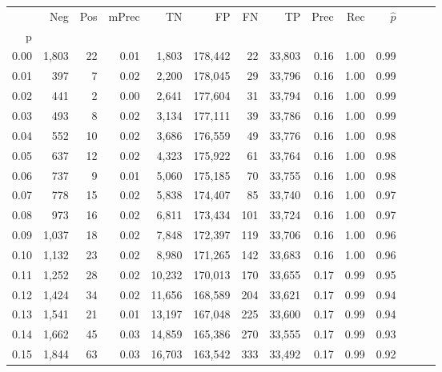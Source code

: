 \begin{tabular}{rrrrrrrrrrrrrr}
\toprule
{} &    Neg &  Pos & mPrec &       TN &       FP &      FN &      TP &  Prec &   Rec & $\hat{p}$ \\
p    &        &      &       &          &          &         &         &       &       &           \\
\midrule
0.00 &  1,803 &   22 &  0.01 &    1,803 &  178,442 &      22 &  33,803 &  0.16 &  1.00 &      0.99 \\
0.01 &    397 &    7 &  0.02 &    2,200 &  178,045 &      29 &  33,796 &  0.16 &  1.00 &      0.99 \\
0.02 &    441 &    2 &  0.00 &    2,641 &  177,604 &      31 &  33,794 &  0.16 &  1.00 &      0.99 \\
0.03 &    493 &    8 &  0.02 &    3,134 &  177,111 &      39 &  33,786 &  0.16 &  1.00 &      0.99 \\
0.04 &    552 &   10 &  0.02 &    3,686 &  176,559 &      49 &  33,776 &  0.16 &  1.00 &      0.98 \\
0.05 &    637 &   12 &  0.02 &    4,323 &  175,922 &      61 &  33,764 &  0.16 &  1.00 &      0.98 \\
0.06 &    737 &    9 &  0.01 &    5,060 &  175,185 &      70 &  33,755 &  0.16 &  1.00 &      0.98 \\
0.07 &    778 &   15 &  0.02 &    5,838 &  174,407 &      85 &  33,740 &  0.16 &  1.00 &      0.97 \\
0.08 &    973 &   16 &  0.02 &    6,811 &  173,434 &     101 &  33,724 &  0.16 &  1.00 &      0.97 \\
0.09 &  1,037 &   18 &  0.02 &    7,848 &  172,397 &     119 &  33,706 &  0.16 &  1.00 &      0.96 \\
0.10 &  1,132 &   23 &  0.02 &    8,980 &  171,265 &     142 &  33,683 &  0.16 &  1.00 &      0.96 \\
0.11 &  1,252 &   28 &  0.02 &   10,232 &  170,013 &     170 &  33,655 &  0.17 &  0.99 &      0.95 \\
0.12 &  1,424 &   34 &  0.02 &   11,656 &  168,589 &     204 &  33,621 &  0.17 &  0.99 &      0.94 \\
0.13 &  1,541 &   21 &  0.01 &   13,197 &  167,048 &     225 &  33,600 &  0.17 &  0.99 &      0.94 \\
0.14 &  1,662 &   45 &  0.03 &   14,859 &  165,386 &     270 &  33,555 &  0.17 &  0.99 &      0.93 \\
0.15 &  1,844 &   63 &  0.03 &   16,703 &  163,542 &     333 &  33,492 &  0.17 &  0.99 &      0.92 \\

\end{tabular}
